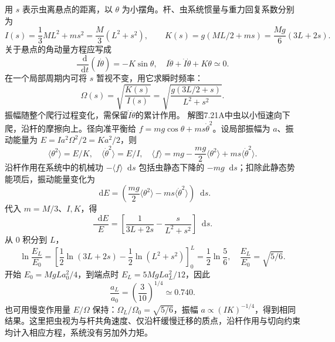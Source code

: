 \documentclass[UTF8,fontset=fandol,a4paper,11pt]{ctexart}
\newcommand{\dd}{\mathop{}\!\mathrm{d}}
\newcommand{\figcaption}[1]{\par\vspace{2pt}{\small\color{muted}#1}\par}
\begin{document}
\begin{center}\begin{minipage}{\linewidth}\centering{}\figcaption{解图 7.21A}\end{minipage}\end{center}
用 $s$ 表示虫离悬点的距离，以 $\theta$ 为小摆角。杆、虫系统惯量与重力回复系数分别为
\[I(s)=\frac13ML^2+ms^2=\frac M3(L^2+s^2),\qquad
K(s)=g(ML/2+ms)=\frac{Mg}{6}(3L+2s).\]
关于悬点的角动量方程应写成
\[\frac{\dd}{\dd t}(I\dot\theta)=-K\sin\theta,
\quad I\ddot\theta+\dot I\dot\theta+K\theta\simeq0.\]
在一个局部周期内可将 $s$ 暂视不变，用它求瞬时频率：
\[\boxed{\Omega(s)=\sqrt{\frac{K(s)}{I(s)}}
=\sqrt{\frac{g(3L/2+s)}{L^2+s^2}}.}\]
振幅随整个爬行过程变化，需保留$\dot I\dot\theta$的累计作用。
解图7.21A中虫以小恒速向下爬，沿杆的摩擦向上。径向准平衡给 $f=mg\cos\theta+ms\dot\theta^2$。设局部振幅为 $a$、振动能量为 $E=Ia^2\Omega^2/2=Ka^2/2$，则
\[\langle\theta^2\rangle=E/K,\quad
\langle\dot\theta^2\rangle=E/I,\quad
\langle f\rangle=mg-\frac{mg}{2}\langle\theta^2\rangle
+ms\langle\dot\theta^2\rangle.\]
沿杆作用在系统中的机械功 $-\langle f\rangle\dd s$ 包括虫静态下降的 $-mg\dd s$；扣除此静态势能项后，振动能量变化为
\[\dd E=\left(\frac{mg}{2}\langle\theta^2\rangle
-ms\langle\dot\theta^2\rangle\right)\dd s.\]
代入 $m=M/3$、$I,K$，得
\[\frac{\dd E}{E}=\left[\frac1{3L+2s}-\frac{s}{L^2+s^2}\right]\dd s.\]
从 $0$ 积分到 $L$，
\[\ln\frac{E_L}{E_0}=\left[\frac12\ln(3L+2s)
-\frac12\ln(L^2+s^2)\right]_0^L
=\frac12\ln\frac56,\quad\frac{E_L}{E_0}=\sqrt{5/6}.\]
开始 $E_0=MgLa_0^2/4$，到端点时 $E_L=5MgLa_L^2/12$，因此
\[\boxed{\frac{a_L}{a_0}=\left(\frac3{10}\right)^{1/4}\simeq0.740.}\]
也可用慢变作用量 $E/\Omega$ 保持：$\Omega_L/\Omega_0=\sqrt{5/6}$，振幅 $a\propto(IK)^{-1/4}$，得到相同结果。这里把虫视为与杆共角速度、仅沿杆缓慢迁移的质点，沿杆作用与切向约束均计入相应方程，系统没有另加外力矩。
\end{document}
